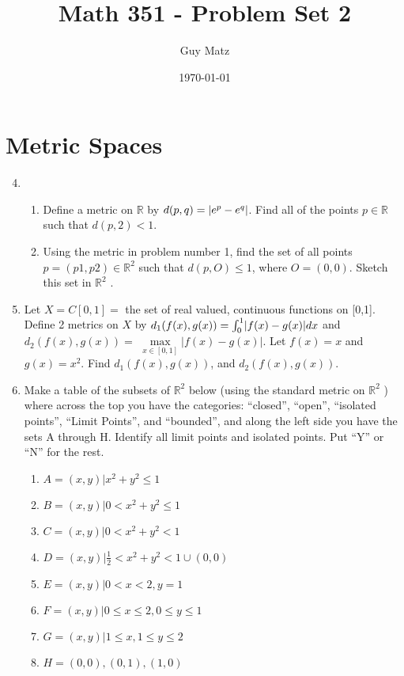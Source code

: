 \documentclass[12pt]{amsart}
\title{\textbf{Math 351 - Problem Set 2}}
\author{Guy Matz}
\date{\today}
\newcommand{\benu}{\begin{enumerate}}
\newcommand{\eenu}{\end{enumerate}}
\theoremstyle{definition}
\newcommand{\mbR}{\mathbb{R}}
\DeclarePairedDelimiter\abs{\lvert}{\rvert}
\begin{document}
 

\maketitle

\section{Metric Spaces}
\begin{enumerate}[series=p]
\setcounter{enumi}{3}
\item
	\benu
		\item Define a metric on $\mbR$ by $d(p, q) = \abs{e^p - e^q}$. Find all of the points $p \in \mbR$ such that $d(p, 2) < 1$.
		\item Using the metric in problem number 1, find the set of all points
		$p = (p 1 , p 2 ) \in \mbR^2$ such that $d(p, O) \leq 1$, where $O = (0, 0)$. Sketch this set in $\mbR^2$ .
	\eenu
\newpage


\item Let $X = C[0,1]=$ the set of real valued, continuous functions on [0,1].  Define 2 metrics on $X$ by $d_1(f(x), g(x)) = \int_{0}^{1} \abs{f (x) - g(x)}dx$ and
$d_2(f(x), g(x)) =$ $\max\limits_{x \in [0,1]} |f(x) - g(x)|$. Let $f(x) = x$ and $g(x) = x^2$.
Find $d_1(f(x), g(x))$, and $d_2(f(x), g(x))$.

\newpage

\item Make a table of the subsets of $\mbR^2$ below (using the standard metric on $\mbR^2$ ) where across the top you have the categories: “closed”, “open”, “isolated points”, “Limit Points”, and “bounded”, and along the left side you have the sets A through H. Identify all limit points and isolated points. Put “Y” or “N” for the rest.
	\benu
		\item $A = {(x, y)| x^2 + y^2 \leq 1}$
		\item $B = {(x, y)| 0 < x^2 + y^2 \leq 1}$
		\item $C = {(x, y)| 0 < x^2 + y^2 < 1}$
		\item $D = {(x, y)|	\frac{1}{2}	< x^2 + y^2 < 1} \cup {(0,0)}$
		\item $E = {(x, y)| 0 < x < 2, y = 1}$
		\item $F = {(x, y)| 0 \leq x \leq 2, 0 \leq y \leq 1}$
		\item $G = {(x, y)| 1 \leq x, 1 \leq y \leq 2}$
		\item $H = {(0,0), (0,1), (1,0)}$
	\eenu
	

\end{enumerate}
\end{document}
